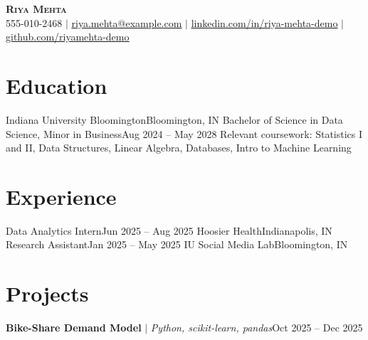 

\begin{center}
    \textbf{\Huge \scshape Riya Mehta} \\ \vspace{1pt}
    \small 555-010-2468 $|$ \href{mailto:riya.mehta@example.com}{\underline{riya.mehta@example.com}} $|$
    \href{https://linkedin.com/in/riya-mehta-demo}{\underline{linkedin.com/in/riya-mehta-demo}} $|$
    \href{https://github.com/riyamehta-demo}{\underline{github.com/riyamehta-demo}}
\end{center}

\section{Education}
  \resumeSubHeadingListStart
    \resumeSubheading
      {Indiana University Bloomington}{Bloomington, IN}
      {Bachelor of Science in Data Science, Minor in Business}{Aug 2024 -- May 2028}
  \resumeSubHeadingListEnd
  \small{Relevant coursework: Statistics I and II, Data Structures, Linear Algebra, Databases, Intro to Machine Learning}

\section{Experience}
  \resumeSubHeadingListStart
    \resumeSubheading
      {Data Analytics Intern}{Jun 2025 -- Aug 2025}
      {Hoosier Health}{Indianapolis, IN}
      \resumeItemListStart
      \resumeItemListEnd
    \resumeSubheading
      {Research Assistant}{Jan 2025 -- May 2025}
      {IU Social Media Lab}{Bloomington, IN}
      \resumeItemListStart
      \resumeItemListEnd
  \resumeSubHeadingListEnd

\section{Projects}
    \resumeSubHeadingListStart
      \resumeProjectHeading
          {\textbf{Bike-Share Demand Model} $|$ \emph{Python, scikit-learn, pandas}}{Oct 2025 -- Dec 2025}
          \resumeItemListStart
          \resumeItemListEnd
    \resumeSubHeadingListEnd


